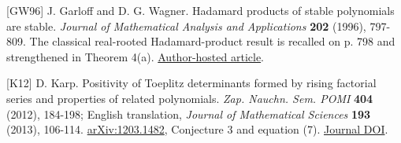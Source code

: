 \documentclass[11pt]{article}
\begin{document}
{[}GW96{]} J. Garloff and D. G. Wagner. Hadamard products of stable
polynomials are stable. \emph{Journal of Mathematical Analysis and
Applications} \textbf{202} (1996), 797-809. The classical real-rooted
Hadamard-product result is recalled on p. 798 and strengthened in
Theorem 4(a).
\href{https://www-home.htwg-konstanz.de/~garloff/Garloff_Wagner_Hadamard_Products.pdf}{Author-hosted
article}.

{[}K12{]} D. Karp. Positivity of Toeplitz determinants formed by rising
factorial series and properties of related polynomials. \emph{Zap.
Nauchn. Sem. POMI} \textbf{404} (2012), 184-198; English translation,
\emph{Journal of Mathematical Sciences} \textbf{193} (2013), 106-114.
\href{https://arxiv.org/abs/1203.1482}{arXiv:1203.1482}, Conjecture 3
and equation (7).
\href{https://doi.org/10.1007/s10958-013-1438-y}{Journal DOI}.
\end{document}
